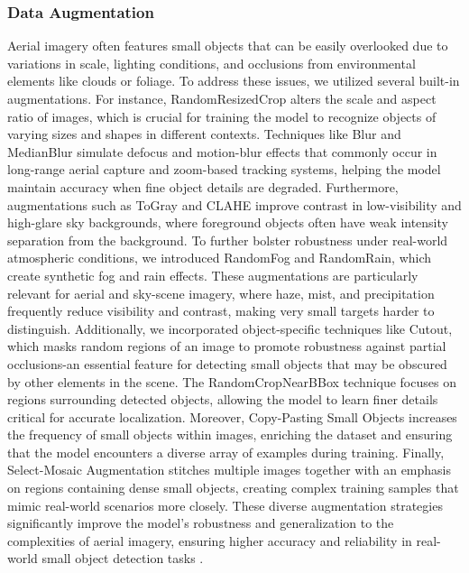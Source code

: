\documentclass[preprint,review,12pt]{elsarticle}
\begin{document}
\subsubsection{Data Augmentation}
Aerial imagery often features small objects that can be easily overlooked due to variations in scale, lighting conditions, and occlusions from environmental elements like clouds or foliage. To address these issues, we utilized several built-in augmentations. For instance, RandomResizedCrop alters the scale and aspect ratio of images, which is crucial for training the model to recognize objects of varying sizes and shapes in different contexts. Techniques like Blur and MedianBlur simulate defocus and motion-blur effects that commonly occur in long-range aerial capture and zoom-based tracking systems, helping the model maintain accuracy when fine object details are degraded. Furthermore, augmentations such as ToGray and CLAHE improve contrast in low-visibility and high-glare sky backgrounds, where foreground objects often have weak intensity separation from the background. To further bolster robustness under real-world atmospheric conditions, we introduced RandomFog and RandomRain, which create synthetic fog and rain effects. These augmentations are particularly relevant for aerial and sky-scene imagery, where haze, mist, and precipitation frequently reduce visibility and contrast, making very small targets harder to distinguish. Additionally, we incorporated object-specific techniques like Cutout, which masks random regions of an image to promote robustness against partial occlusions-an essential feature for detecting small objects that may be obscured by other elements in the scene. The RandomCropNearBBox technique focuses on regions surrounding detected objects, allowing the model to learn finer details critical for accurate localization. Moreover, Copy-Pasting Small Objects increases the frequency of small objects within images, enriching the dataset and ensuring that the model encounters a diverse array of examples during training. Finally, Select-Mosaic Augmentation stitches multiple images together with an emphasis on regions containing dense small objects, creating complex training samples that mimic real-world scenarios more closely.
These diverse augmentation strategies significantly improve the model’s robustness and generalization to the complexities of aerial imagery, ensuring higher accuracy and reliability in real-world small object detection tasks \cite{Kupyn2018}. 
\end{document}
